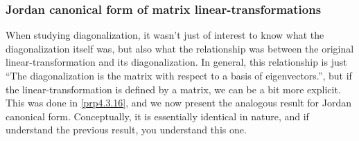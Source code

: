 \subsubsection{Jordan canonical form of matrix linear-transformations}

When studying diagonalization, it wasn't just of interest to know what the diagonalization itself was, but also what the relationship was between the original linear-transformation and its diagonalization.  In general, this relationship is just ``The diagonalization is the matrix with respect to a basis of eigenvectors.'', but if the linear-transformation is defined by a matrix, we can be a bit more explicit.  This was done in \cref{prp4.3.16}, and we now present the analogous result for Jordan canonical form.  Conceptually, it is essentially identical in nature, and if understand the previous result, you understand this one.
